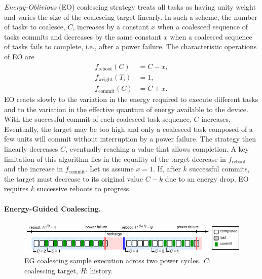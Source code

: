 {\em Energy-Oblivious} (EO) coalescing strategy treats all tasks as having unity weight and varies the size of the coalescing target linearly. In such a scheme, the number of tasks to coalesce, $C$, increases by a constant $x$ when a coalesced sequence of tasks commits and decreases by the same constant $x$ when a coalesced sequence of tasks fails to complete, i.e., after a power failure. The characteristic operations of EO are
%
\begin{equation}
	\begin{split}
		f_\text{reboot}(C) & = C - x, \\
		f_\text{weight}(T_\text{i}) & =  1, \\
		f_\text{commit}(C) & = C + x.
	\end{split}
	\label{eq:eo}
\end{equation}
%
EO reacts slowly to the variation in the energy required to execute different tasks and to the variation in the effective quantum of energy available to the device. With the successful commit of each coalesced task sequence, $C$ increases. Eventually, the target may be too high and only a coalesced task composed of a few units will commit without interruption by a power failure. The strategy then linearly decreases $C$, eventually reaching a value that allows completion. A key limitation of this algorithm lies in the equality of the target decrease in $f_\text{reboot}$ and the increase in $f_\text{commit}$. Let us assume $x=1$. If, after $k$ successful commits, the target must decrease to its original value $C-k$ due to an energy drop, EO requires $k$ successive reboots to progress.

\paragraph{Energy-Guided Coalescing.}
\label{subsec:energyAware}

\begin{figure}
    \includegraphics[width=\linewidth]{figures/hg-coal-horiz.pdf}
    \caption{EG coalescing sample execution across two power cycles. \emph{C}: coalescing target, \emph{H}: history.}
    \label{fig:hg-coal}
\end{figure}

